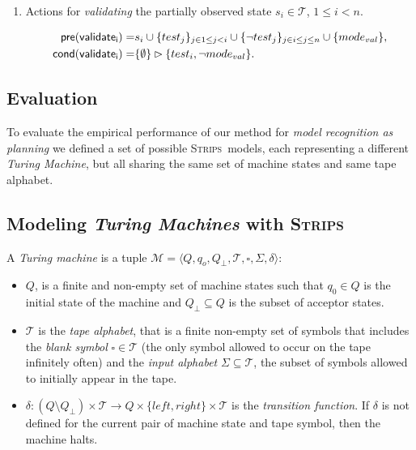 \documentclass[letterpaper]{article} %
\newcommand{\tup}[1]{{\langle #1 \rangle}}
\newcommand{\pre}{\mathsf{pre}}     %
\newcommand{\cond}{\mathsf{cond}}   %
\newcommand{\strips}{\textsc{Strips}}     %
\begin{document}
\begin{itemize}
\begin{enumerate}
\item Actions for {\em validating} the partially observed state $s_i\in\mathcal{T}$, {\tt\small $1\leq i< n$}.
\begin{small}
\begin{align*}
\hspace*{7pt}\pre(\mathsf{validate_{i}})=&s_i\cup\{test_j\}_{j\in 1\leq j<i}\cup\{\neg test_j\}_{j\in i\leq j\leq n}\cup \{mode_{val}\},\\
\cond(\mathsf{validate_{i}})=&\{\emptyset\}\rhd\{test_i,\neg mode_{val}\}.
\end{align*}
\end{small}
\end{enumerate}
\end{itemize}



\subsection{Evaluation}
\label{sec:evaluation}
To evaluate the empirical performance of our method for {\em model recognition as planning} we defined a set of possible \strips\ models, each representing a different {\em Turing Machine}, but all sharing the same set of machine states and same tape alphabet.

\subsection{Modeling {\em Turing Machines} with \strips\ }
A {\em Turing machine} is a tuple $\mathcal{M}=\tup{Q,q_o,Q_{\bot},\mathcal{T},\square,\Sigma,\delta}$:
\begin{itemize}
\item $Q$, is a finite and non-empty set of machine states such that $q_0\in Q$ is the initial state of the machine and $Q_{\bot}\subseteq Q$ is the subset of acceptor states.  
\item $\mathcal{T}$ is the {\em tape alphabet}, that is a finite non-empty set of symbols that includes the {\em blank symbol} $\square\in\mathcal{T}$ (the only symbol allowed to occur on the tape infinitely often) and the {\em input alphabet} $\Sigma\subseteq\mathcal{T}$, the subset of symbols allowed to initially appear in the tape.
\item $\delta: (Q\setminus Q_{\bot})\times \mathcal{T}\rightarrow Q\times\{left,right\}\times \mathcal{T}$ is the {\em transition function}. If $\delta$ is not defined for the current pair of machine state and tape symbol, then the machine halts.
\end{itemize}
\end{document}
